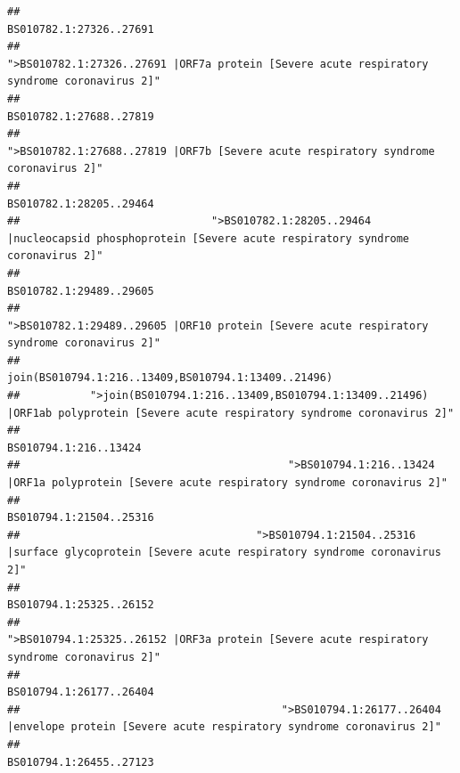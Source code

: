 \documentclass[
]{article}
\begin{document}
\begin{verbatim}
##                                                                                                                BS010782.1:27326..27691 
##                                            ">BS010782.1:27326..27691 |ORF7a protein [Severe acute respiratory syndrome coronavirus 2]" 
##                                                                                                                BS010782.1:27688..27819 
##                                                    ">BS010782.1:27688..27819 |ORF7b [Severe acute respiratory syndrome coronavirus 2]" 
##                                                                                                                BS010782.1:28205..29464 
##                              ">BS010782.1:28205..29464 |nucleocapsid phosphoprotein [Severe acute respiratory syndrome coronavirus 2]" 
##                                                                                                                BS010782.1:29489..29605 
##                                            ">BS010782.1:29489..29605 |ORF10 protein [Severe acute respiratory syndrome coronavirus 2]" 
##                                                                                    join(BS010794.1:216..13409,BS010794.1:13409..21496) 
##           ">join(BS010794.1:216..13409,BS010794.1:13409..21496) |ORF1ab polyprotein [Severe acute respiratory syndrome coronavirus 2]" 
##                                                                                                                  BS010794.1:216..13424 
##                                          ">BS010794.1:216..13424 |ORF1a polyprotein [Severe acute respiratory syndrome coronavirus 2]" 
##                                                                                                                BS010794.1:21504..25316 
##                                     ">BS010794.1:21504..25316 |surface glycoprotein [Severe acute respiratory syndrome coronavirus 2]" 
##                                                                                                                BS010794.1:25325..26152 
##                                            ">BS010794.1:25325..26152 |ORF3a protein [Severe acute respiratory syndrome coronavirus 2]" 
##                                                                                                                BS010794.1:26177..26404 
##                                         ">BS010794.1:26177..26404 |envelope protein [Severe acute respiratory syndrome coronavirus 2]" 
##                                                                                                                BS010794.1:26455..27123 

\end{verbatim}
\end{document}
